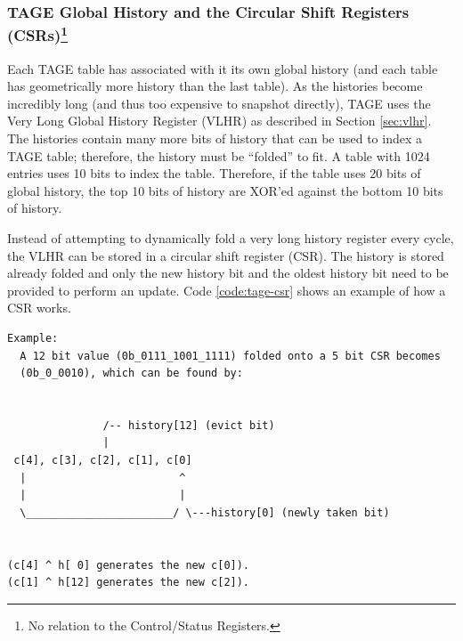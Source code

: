 \subsubsection{TAGE Global History and the Circular Shift Registers (CSRs)\footnote{No relation to the Control/Status Registers.}}

Each TAGE table has associated with it its own global history (and each table has geometrically more history than the last table). As the histories become incredibly long (and thus too expensive to snapshot directly), TAGE uses the Very Long Global History Register (VLHR) as described in Section \ref{sec:vlhr}.  The histories contain many more bits of history that can be used to index a TAGE table; therefore, the history must be ``folded'' to fit. A table with 1024 entries uses 10 bits to index the table. Therefore, if the table uses 20 bits of global history, the top 10 bits of history are XOR'ed against the bottom 10 bits of history. 

Instead of attempting to dynamically fold a very long history register every cycle, the VLHR can be stored in a circular shift register (CSR).  The history is stored already folded and only the new history bit and the oldest history bit need to be provided to perform an update. Code \ref{code:tage-csr} shows an example of how a CSR works. 

\begin{center}
\begin{minipage}{0.90\textwidth}
\begin{lstlisting}[caption={The circular shift register. When a new branch outcome is added, the register is shifted (and wrapped around). The new outcome is XOR'ed into the bottom and the oldest bit in the history is ``evicted'' by XOR'ing it at the {\tt (12\%5)} position. }]
Example:   
  A 12 bit value (0b_0111_1001_1111) folded onto a 5 bit CSR becomes 
  (0b_0_0010), which can be found by:                                       
                                                                             
                                                                             
               /-- history[12] (evict bit)                                   
               |                                                             
 c[4], c[3], c[2], c[1], c[0]                                                
  |                        ^                                                 
  |                        |                                                 
  \_______________________/ \---history[0] (newly taken bit)                 
                                                                             
                                                                             
(c[4] ^ h[ 0] generates the new c[0]).                                        
(c[1] ^ h[12] generates the new c[2]).       
\end{lstlisting}\label{code:tage-csr}
\end{minipage}
\end{center}                                 

